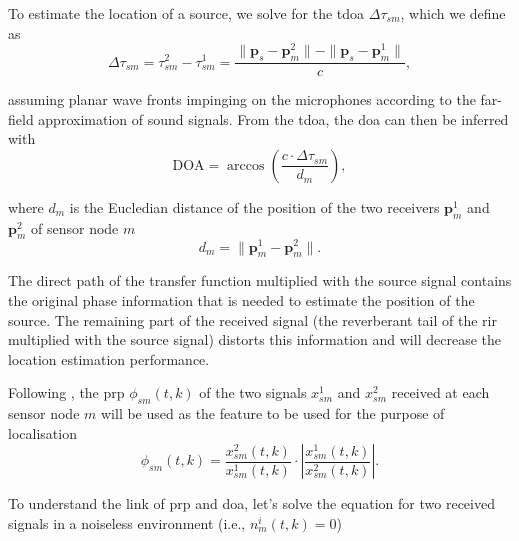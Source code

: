 To estimate the location of a source, we solve for the \gls{tdoa} $\Delta\tau_{sm}$, which we define as
\begin{equation}
    \Delta\tau_{sm}=\tau^2_{sm}-\tau^1_{sm}=\frac{\|\bm p_s-\bm p_m^2\|-\|\bm p_s-\bm p_m^1\|}{c},
\end{equation}

assuming planar wave fronts impinging on the microphones according to the far-field approximation of sound signals. From the \gls{tdoa}, the \gls{doa} can then be inferred with
\begin{equation}
    \text{DOA}=\arccos\left (\frac{c\cdot \Delta\tau_{sm}}{d_m}\right ),
\end{equation}

where $d_m$ is the Eucledian distance of the position of the two receivers $\bm p_m^1$ and $\bm p_m^2$ of sensor node $m$
\begin{equation}
    d_m=\| \bm p_m^1-\bm p_m^2\|.
\end{equation}

The direct path of the transfer function multiplied with the source signal contains the original phase information that is needed to estimate the position of the source. The remaining part of the received signal (the reverberant tail of the \gls{rir} multiplied with the source signal) distorts this information and will decrease the location estimation performance. 

Following \cite{Schwartz2014}, the \gls{prp} $\phi_{sm}(t,k)$ of the two signals $x_{sm}^1$ and $x_{sm}^2$ received at each sensor node $m$ will be used as the feature to be used for the purpose of localisation
\begin{equation}
    \phi_{sm}(t,k)=\frac{x^2_{sm}(t,k)}{x^1_{sm}(t,k)}\cdot \left |\frac{x^1_{sm}(t,k)}{x^2_{sm}(t,k)}\right |.
\label{eq:prp}
\end{equation}

To understand the link of \gls{prp} and \gls{doa}, let's solve the equation for two received signals in a noiseless environment (i.e., $n^i_{m}(t,k)=0$)

